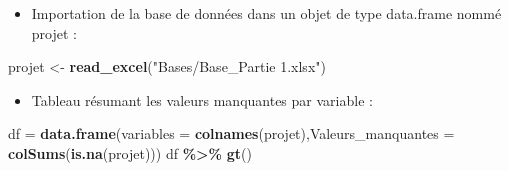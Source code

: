 \documentclass[
]{article}
\newenvironment{Shaded}{\begin{snugshade}}{\end{snugshade}}
\newcommand{\AttributeTok}[1]{\textcolor[rgb]{0.13,0.29,0.53}{#1}}
\newcommand{\FunctionTok}[1]{\textcolor[rgb]{0.13,0.29,0.53}{\textbf{#1}}}
\newcommand{\NormalTok}[1]{#1}
\newcommand{\OtherTok}[1]{\textcolor[rgb]{0.56,0.35,0.01}{#1}}
\newcommand{\SpecialCharTok}[1]{\textcolor[rgb]{0.81,0.36,0.00}{\textbf{#1}}}
\newcommand{\StringTok}[1]{\textcolor[rgb]{0.31,0.60,0.02}{#1}}
\providecommand{\tightlist}{%
  \setlength{\itemsep}{0pt}\setlength{\parskip}{0pt}}
\begin{document}
\begin{itemize}
\tightlist
\item
  Importation de la base de données dans un objet de type data.frame
  nommé projet :
\end{itemize}

\begin{Shaded}
\begin{Highlighting}[]
\NormalTok{projet }\OtherTok{\textless{}{-}} \FunctionTok{read\_excel}\NormalTok{(}\StringTok{"Bases/Base\_Partie 1.xlsx"}\NormalTok{)}
\end{Highlighting}
\end{Shaded}

\begin{itemize}
\tightlist
\item
  Tableau résumant les valeurs manquantes par variable :
\end{itemize}

\begin{Shaded}
\begin{Highlighting}[]
\NormalTok{df }\OtherTok{=} \FunctionTok{data.frame}\NormalTok{(}\AttributeTok{variables =} \FunctionTok{colnames}\NormalTok{(projet),}\AttributeTok{Valeurs\_manquantes =} \FunctionTok{colSums}\NormalTok{(}\FunctionTok{is.na}\NormalTok{(projet)))}
\NormalTok{df }\SpecialCharTok{\%\textgreater{}\%} \FunctionTok{gt}\NormalTok{()}
\end{Highlighting}
\end{Shaded}
\end{document}
